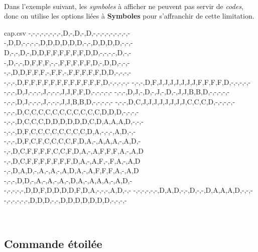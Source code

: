 \documentclass{article}
\newcommand\Cle[1]{{\bfseries\sffamily\textlangle #1\textrangle}}
\begin{document}
\begin{PresentationCode}{}
~~
~~
\end{PresentationCode}

\pagebreak

Dans l'exemple suivant, les \textit{symboles} à afficher ne peuvent pas servir de \textit{codes}, donc on utilise les options liées à \Cle{Symboles} pour s'affranchir de cette limitation.

\begin{PresentationCode}{}

\begin{filecontents*}[overwrite]{cap.csv}
	-,-,-,-,-,-,-,-,D,-,D,-,D,-,-,-,-,-,-,-,-,-
	-,D,D,-,-,-,-,D,D,D,D,D,D,-,-,D,D,D,D,-,-,-
	D,-,-,D,-,D,D,F,F,F,F,F,F,D,D,-,-,-,-,D,-,-
	-,D,-,-,D,F,F,F,-,-,F,F,F,F,F,D,-,D,D,-,-,-
	-,-,D,D,F,F,F,-,F,F,-,F,F,F,F,F,D,D,-,-,-,-
	-,-,-,D,F,F,F,F,F,F,F,F,F,F,F,F,D,-,-,-,-,-
	-,-,-,D,F,J,J,J,J,J,J,J,F,F,F,F,D,-,-,-,-,-
	-,-,-,D,J,-,-,-,J,-,-,-,J,J,F,F,D,-,-,-,-,-
	-,-,-,D,J,-,D,-,J,-,D,-,J,J,B,B,D,-,-,-,-,-
	-,-,-,D,J,-,-,-,J,-,-,-,J,J,B,B,D,-,-,-,-,-
	-,-,-,D,C,J,J,J,J,J,J,J,J,C,C,C,D,-,-,-,-,-
	-,-,-,D,C,C,C,C,C,C,C,C,C,C,C,D,D,D,-,-,-,-
	-,-,-,D,C,C,C,D,D,D,D,D,D,C,D,A,A,A,D,-,-,-
	-,-,-,D,F,C,C,C,C,C,C,C,C,D,A,-,-,-,A,D,-,-
	-,-,-,D,F,C,F,C,C,C,C,F,D,A,-,A,A,A,-,A,D,-
	-,-,D,C,F,F,F,F,C,C,F,D,A,-,A,F,F,F,A,-,A,D
	-,-,D,C,F,F,F,F,F,F,F,D,A,-,A,F,-,F,A,-,A,D
	-,-,D,A,D,-,A,-,A,-,A,D,A,-,A,F,F,F,A,-,A,D
	-,-,-,D,D,-,A,-,A,-,A,-,D,A,-,A,A,A,-,A,D,-
	-,-,-,-,-,D,D,F,D,D,D,D,F,D,A,-,-,-,A,D,-,-
	-,-,-,-,-,-,D,A,D,-,-,D,-,-,D,A,A,A,D,-,-,-
	-,-,-,-,-,-,D,D,D,-,-,D,D,D,D,D,D,D,-,-,-,-
\end{filecontents*}

~~
\end{PresentationCode}

\pagebreak

\subsection{Commande étoilée}
\end{document}
